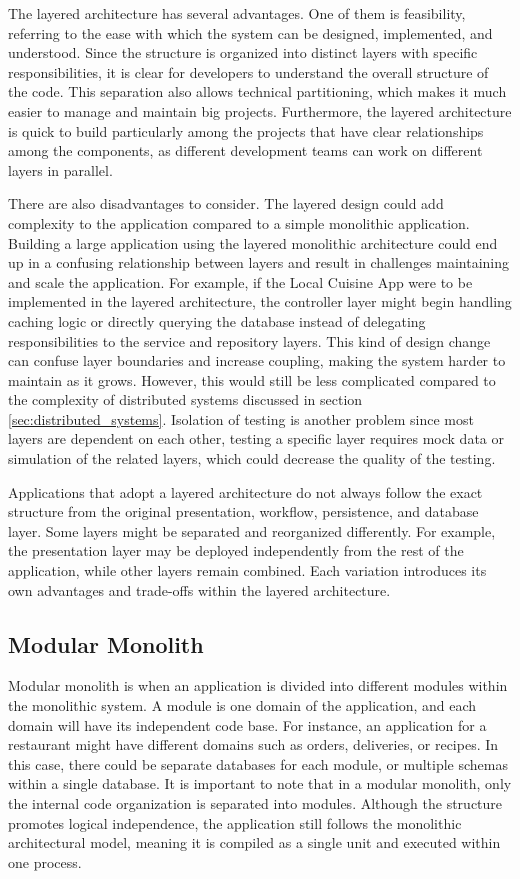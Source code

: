 The layered architecture has several advantages. One of them is feasibility, referring to the ease with which the system can be designed, implemented, and understood.
Since the structure is organized into distinct layers
with specific responsibilities, it is clear for developers to understand the overall structure of the code. This separation also allows technical partitioning, which makes it
much easier to manage and maintain big projects. 
Furthermore, the layered architecture is quick to build particularly among the projects that have clear relationships among the components, as different development teams can work on different layers in parallel.

There are also disadvantages to consider. The layered design could add complexity to the application compared to a simple monolithic application. 
Building a large application using the layered monolithic architecture could end up in a confusing relationship between layers and result in challenges maintaining and scale the application.
For example, if the Local Cuisine App were to be implemented in the layered architecture, the controller layer might begin
handling caching logic or directly querying the database instead of delegating responsibilities to the service and repository layers.
This kind of design change can confuse layer boundaries and increase coupling, making the system harder to maintain as it grows.
However, this would still be less complicated compared to the complexity of distributed systems discussed in section \ref{sec:distributed_systems}.
Isolation of testing is another problem since most layers are dependent on each other, testing a specific layer requires mock data or simulation of
the related layers, which could decrease the quality of the testing.

Applications that adopt a layered architecture do not always follow the exact structure from the original presentation, workflow, persistence, and database layer.
Some layers might be separated and reorganized differently.
For example, the presentation layer may be deployed independently from the rest of the application,
while other layers remain combined. Each variation introduces its own advantages and trade-offs within the layered architecture.

\subsection[Modular Monolith]{Modular Monolith}
Modular monolith is when an application is divided into different modules within the monolithic system. A module is one domain of the application,
and each domain will have its independent code base. For instance, an application for a restaurant might have different domains such as orders, deliveries, or recipes.
In this case, there could be separate databases for each module, or multiple schemas within a single database.
It is important to note that in a modular monolith, only the internal code organization is separated into modules.
Although the structure promotes logical independence, the application still follows the monolithic architectural model,
meaning it is compiled as a single unit and executed within one process.

